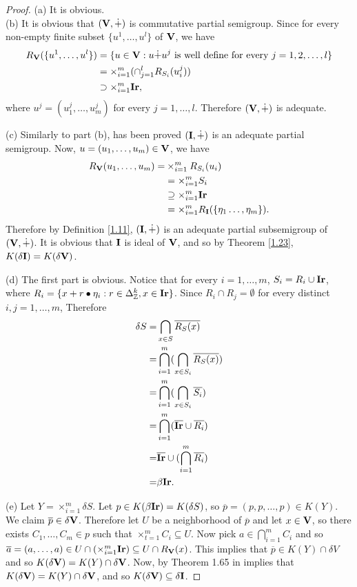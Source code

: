 \documentclass{amsart}
\theoremstyle{definition}
\theoremstyle{remark}
\numberwithin{equation}{section}
\newcommand{\Ir}{{\bf{Ir}}}
\newcommand{\V}{{\bf{V}}}
\newcommand{\I}{{\bf{I}}}
\begin{document}
\begin{proof}
	(a) It is obvious. \\	
	(b) It is obvious that $(\V,\dot{+})$ is commutative partial semigroup. Since for every non-empty finite subset $\{u^1,\ldots,u^l\}$ of $\V$, we have 
	\begin{align*}
	R_\V(\{u^1,\ldots,u^l\})&=\{u\in\V:u\dot{+}u^j\mbox{ is well define for every }j=1,2,\ldots,l\}\\
	&=\times_{i=1}^m(\cap_{j=1}^l R_{S_i}(u^j_i))\\
	&\supset\times_{i=1}^m\Ir,
	\end{align*}
	where $u^j=(u_1^j,\ldots,u_m^j)$ for every $j=1,\ldots, l$. Therefore $(\V,\dot{+})$ is adequate.
	
	(c) Similarly to part (b), has been proved $(\I,\dot{+})$ is an adequate partial semigroup. Now, $u=(u_1,\ldots,u_m)\in \V$, we have 
	\begin{align*}
	R_\V(u_1,\ldots,u_m)=&\times_{i=1}^mR_{S_i}(u_i)\\
	&=\times_{i=1}^mS_i\\
	&\supseteq\times_{i=1}^m\Ir\\
	&=\times_{i=1}^mR_\I(\{\eta_1\ldots,\eta_m\}).
	\end{align*}
	Therefore by Definition \ref{1.11}, $(\I,\dot{+})$ is an adequate partial subsemigroup of $(\V,\dot{+})$. It is obvious that $\I$ is ideal of $\V$, and so by Theorem \ref{1.23}, $K(\delta \I)=K(\delta \V)$.
	
	(d) The first part is obvious. Notice that for every $i=1,\ldots,m$, $S_i=R_i\cup\Ir$, where $R_i=\{x+r\bullet \eta_i:r\in\Delta_{\mathbb{Z}}^k, x\in \Ir\}$. Since $R_i\cap R_j=\emptyset$ for every distinct $i,j=1,\ldots,m$,  Therefore 
	\begin{align*}
	\delta S=&\bigcap_{x\in S}\overline{R_S(x)}\\
	=&\bigcap_{i=1}^m(\bigcap_{x\in S_i}\overline{R_S(x)})\\
	=&\bigcap_{i=1}^m(\bigcap_{x\in S_i}\overline{ S_i})\\
		=&\bigcap_{i=1}^m(\overline{\Ir}\cup\overline{R_i})\\
		=&\overline{\Ir}\cup(\bigcap_{i=1}^m\overline{R_i})\\
		=&\beta \Ir.
	\end{align*}
	
	(e) Let $Y=\times_{i=1}^m\delta S$. Let \( p \in K(\beta\Ir)=K(\delta S)\), so \(\overline{p} = (p, p, \ldots, p) \in K(Y) \). We claim $\overline{p}\in \delta \V$. Therefore let $U$ be a neighborhood of $\overline{p}$ and let $x\in \V$, so there exists $C_1,\ldots, C_m\in p$ such that $\times_{t=1}^mC_i\subseteq U$. Now pick $a\in\bigcap_{i=1}^mC_i$ and so $\overline{a}=(a,\ldots,a)\in U\cap(\times_{i=1}^m\Ir)\subseteq U\cap R_\V(x)$. This implies that $ \overline{p} \in K(Y)\cap \delta V$ and so $K(\delta \V)=K(Y)\cap \delta \V$. Now, by Theorem 1.65 in \cite{Hindman} implies that $K(\delta \V)=K(Y)\cap\delta \V$, and so $K(\delta \V)\subseteq \delta \I$. 
\end{proof}
\end{document}
